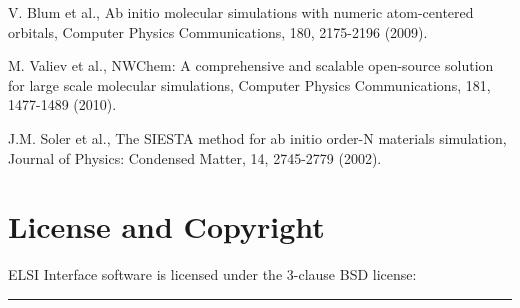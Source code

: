 \documentclass{report}
\begin{document}
\begin{thebibliography}{9}
V. Blum et al., Ab initio molecular simulations with numeric atom-centered orbitals, Computer Physics Communications, 180, 2175-2196 (2009).

M. Valiev et al., NWChem: A comprehensive and scalable open-source solution for large scale molecular simulations, Computer Physics Communications, 181, 1477-1489 (2010).

J.M. Soler et al., The SIESTA method for ab initio order-N materials simulation, Journal of Physics: Condensed Matter, 14, 2745-2779 (2002).



\end{thebibliography}

\newpage
\chapter*{License and Copyright}
ELSI Interface software is licensed under the 3-clause BSD license:\\
\bigskip

\noindent\rule{18cm}{0.4pt}
\bigskip
\end{document}
